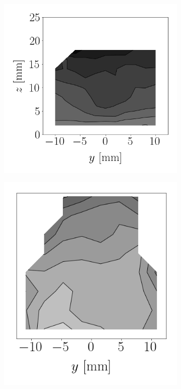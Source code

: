 \begin{figure}[t!]
\vspace*{-0.25in}

\flushleft
\begin{subfigure}[b]{0.2\textwidth}
	\flushleft
   \includegraphics[scale=0.4]{./part2_developments/figures_ch6_lagrangian_JICF/params_breakup_model/maps/expe_SMD}
\end{subfigure}
\hspace*{0.27in}
\begin{subfigure}[b]{0.2\textwidth}
	\flushleft
   \includegraphics[scale=0.4]{./part2_developments/figures_ch6_lagrangian_JICF/params_breakup_model/maps/goro_SMD}

\end{subfigure}
\end{figure}
